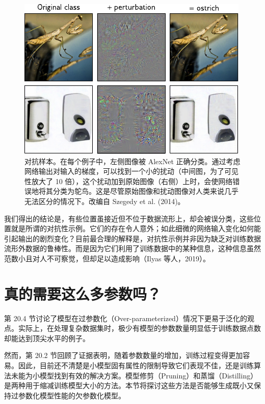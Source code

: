 \documentclass[lang=cn,newtx,10pt,scheme=chinese]{elegantbook}
\begin{document}
\begin{figure}[ht!]
\centering
\includegraphics[width=0.7\linewidth]{PDFFigures/UDLChap21PDF/WhyAdversarial.pdf}
\caption{对抗样本。在每个例子中，左侧图像被 AlexNet 正确分类。通过考虑网络输出对输入的梯度，可以找到一个小的扰动（中间图，为了可见性放大了 10 倍），这个扰动加到原始图像（右侧）上时，会使网络错误地将其分类为鸵鸟。这是尽管原始图像和扰动图像对人类来说几乎无法区分的情况下。改编自 Szegedy et al. (2014)。}
\end{figure}

我们得出的结论是，有些位置虽接近但不位于数据流形上，却会被误分类，这些位置就是所谓的对抗性示例。它们的存在令人意外；如此细微的网络输入变化如何能引起输出的剧烈变化？目前最合理的解释是，对抗性示例并非因为缺乏对训练数据流形外数据的鲁棒性。而是因为它们利用了训练数据中的某种信息，这种信息虽然范数小且对人不可察觉，但却足以造成影响（Ilyas 等人，2019）。

\section{真的需要这么多参数吗？}
第 20.4 节讨论了模型在过参数化（Over-parameterized）情况下更易于泛化的观点。实际上，在处理复杂数据集时，极少有模型的参数数量明显低于训练数据点数却能达到顶尖水平的例子。

然而，第 20.2 节回顾了证据表明，随着参数数量的增加，训练过程变得更加容易。因此，目前还不清楚是小模型固有属性的限制导致它们表现不佳，还是训练算法未能为小模型找到有效的解决方案。模型修剪（Pruning）和蒸馏（Distilling）是两种用于缩减训练模型大小的方法。本节将探讨这些方法是否能够生成既小又保持过参数化模型性能的欠参数化模型。
\end{document}
